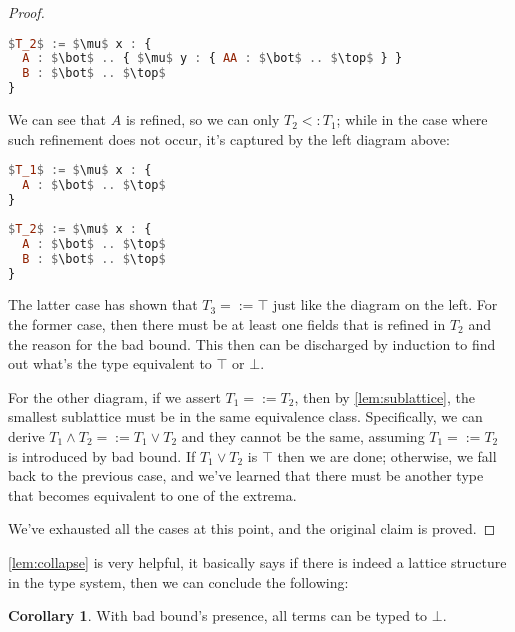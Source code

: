 \documentclass{article}
\theoremstyle{definition}
\newtheorem{corollary}{Corollary}
\begin{document}
\begin{proof}
\begin{multicols}{2}
    \begin{lstlisting}[language=Haskell, mathescape=true]
$T_2$ := $\mu$ x : {
  A : $\bot$ .. { $\mu$ y : { AA : $\bot$ .. $\top$ } }
  B : $\bot$ .. $\top$
}
    \end{lstlisting}
  \end{multicols}    
  \linenumbers

  We can see that $A$ is refined, so we can only $T_2 <: T_1$; while in the case where
  such refinement does not occur, it's captured by the left diagram above:

  \nolinenumbers
  \begin{multicols}{2}
    \begin{lstlisting}[language=Haskell, mathescape=true]
$T_1$ := $\mu$ x : {
  A : $\bot$ .. $\top$
}
    \end{lstlisting}

    \begin{lstlisting}[language=Haskell, mathescape=true]
$T_2$ := $\mu$ x : {
  A : $\bot$ .. $\top$
  B : $\bot$ .. $\top$
}
    \end{lstlisting}
  \end{multicols}    
  \linenumbers

  The latter case has shown that $T_3 =:= \top$ just like the diagram on the left. For
  the former case, then there must be at least one fields that is refined in $T_2$ and
  the reason for the bad bound. This then can be discharged by induction to find out
  what's the type equivalent to $\top$ or $\bot$.
  
  For the other diagram, if we assert $T_1 =:= T_2$, then by \cref{lem:sublattice},
  the smallest sublattice must be in the same equivalence class. Specifically, we can
  derive $T_1 \wedge T_2 =:= T_1 \vee T_2$ and they cannot be the same, assuming
  $T_1 =:= T_2$ is introduced by bad bound. If $T_1 \vee T_2$ is $\top$ then we are
  done; otherwise, we fall back to the previous case, and we've learned that there
  must be another type that becomes equivalent to one of the extrema.

  We've exhausted all the cases at this point, and the original claim is proved.
\end{proof}

\cref{lem:collapse} is very helpful, it basically says if there is indeed a lattice
structure in the type system, then we can conclude the following:

\begin{corollary}
  With bad bound's presence, all terms can be typed to $\bot$. 
\end{corollary}
\end{document}
